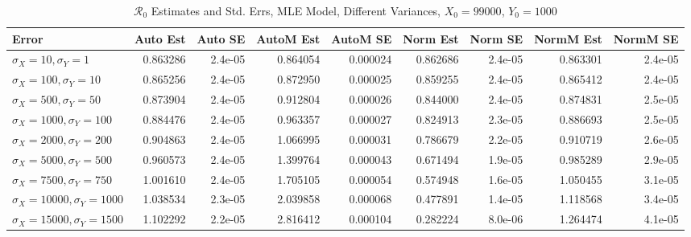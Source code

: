 \documentclass[12pt]{article}
\newcommand{\rr}{\ensuremath{\mathcal{R}_0}}
\begin{document}
\begin{table}[H]
	
	\caption{$\rr$ Estimates and Std. Errs, MLE Model, 
		Different Variances, $X_0 = 99000$, $Y_0 = 1000$}
	\begin{footnotesize}
		\hskip -1.7cm
		\begin{tabular}{l|r|r|r|r|r|r|r|r}
			\hline
			Error & Auto Est & Auto SE & AutoM Est & AutoM SE & Norm Est & Norm SE & NormM Est & NormM SE\\
			\hline
			$\sigma_X = 10, \sigma_Y = 1$ & 0.863286 & 2.4e-05 & 0.864054 & 0.000024 & 0.862686 & 2.4e-05 & 0.863301 & 2.4e-05\\
			\hline
			$\sigma_X = 100, \sigma_Y = 10$ & 0.865256 & 2.4e-05 & 0.872950 & 0.000025 & 0.859255 & 2.4e-05 & 0.865412 & 2.4e-05\\
			\hline
			$\sigma_X = 500, \sigma_Y = 50$ & 0.873904 & 2.4e-05 & 0.912804 & 0.000026 & 0.844000 & 2.4e-05 & 0.874831 & 2.5e-05\\
			\hline
			$\sigma_X = 1000, \sigma_Y = 100$ & 0.884476 & 2.4e-05 & 0.963357 & 0.000027 & 0.824913 & 2.3e-05 & 0.886693 & 2.5e-05\\
			\hline
			$\sigma_X = 2000, \sigma_Y = 200$ & 0.904863 & 2.4e-05 & 1.066995 & 0.000031 & 0.786679 & 2.2e-05 & 0.910719 & 2.6e-05\\
			\hline
			$\sigma_X = 5000, \sigma_Y = 500$ & 0.960573 & 2.4e-05 & 1.399764 & 0.000043 & 0.671494 & 1.9e-05 & 0.985289 & 2.9e-05\\
			\hline
			$\sigma_X = 7500, \sigma_Y = 750$ & 1.001610 & 2.4e-05 & 1.705105 & 0.000054 & 0.574948 & 1.6e-05 & 1.050455 & 3.1e-05\\
			\hline
			$\sigma_X = 10000, \sigma_Y = 1000$ & 1.038534 & 2.3e-05 & 2.039858 & 0.000068 & 0.477891 & 1.4e-05 & 1.118568 & 3.4e-05\\
			\hline
			$\sigma_X = 15000, \sigma_Y = 1500$ & 1.102292 & 2.2e-05 & 2.816412 & 0.000104 & 0.282224 & 8.0e-06 & 1.264474 & 4.1e-05\\
			\hline
		\end{tabular}
	\end{footnotesize}
\end{table}
\end{document}
